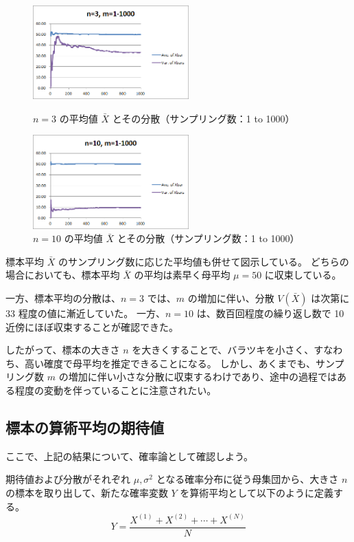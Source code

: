 \documentclass[uplatex,11pt,a4paper]{jsarticle}
\begin{document}
\begin{figure}[htb]
\begin{minipage}{0.5\hsize}
 \centering
	\includegraphics[width=6cm]{./figs/Xbar_n3_m1to1000.png}
	\caption{$n=3$ の平均値 $\bar{X}$ とその分散（サンプリング数：1 to 1000） }
	\label{fig: Xbar_V_n3}
\end{minipage}
\begin{minipage}{0.5\hsize}
 \centering
	\includegraphics[width=6cm]{./figs/Xbar_n10_m1to1000.png}
	\caption{$n=10$ の平均値 $\bar{X}$ とその分散（サンプリング数：1 to 1000） }
	\label{fig: Xbar_V_n10}
\end{minipage}
\end{figure}
標本平均 $\bar{X}$ のサンプリング数に応じた平均値も併せて図示している。
どちらの場合においても、標本平均 $\bar{X}$ の平均は素早く母平均 $\mu = 50$ に収束している。

一方、標本平均の分散は、$n=3$ では、$m$ の増加に伴い、分散 $V(\bar{X})$ は次第に 33 程度の値に漸近していた。
一方、$n=10$ は、数百回程度の繰り返し数で 10 近傍にほぼ収束することが確認できた。

したがって、標本の大きさ $n$ を大きくすることで、バラツキを小さく、すなわち、高い確度で母平均を推定できることになる。
しかし、あくまでも、サンプリング数 $m$ の増加に伴い小さな分散に収束するわけであり、途中の過程ではある程度の変動を伴っていることに注意されたい。


\subsection{標本の算術平均の期待値}
\label{sec:V_ave}

ここで、上記の結果について、確率論として確認しよう。

期待値および分散がそれぞれ $\mu, \sigma^2$ となる確率分布に従う母集団から、大きさ $n$ の標本を取り出して、新たな確率変数 $Y$ を算術平均として以下のように定義する。
\begin{equation*}
Y= \dfrac{X^{(1)} + X^{(2)} + \cdots + X^{(N)} }{N}
\end{equation*}
\end{document}
